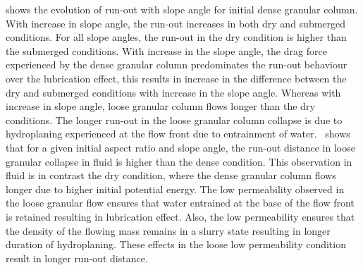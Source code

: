  shows the evolution of run-out with slope angle 
for initial dense granular column. With increase in slope angle, the run-out 
increases in both dry and submerged conditions. For all slope angles, the 
run-out in the dry condition is higher than the submerged conditions. With 
increase in the slope angle, the drag force experienced by the dense granular 
column predominates the run-out behaviour over the lubrication effect, this 
results in increase in the difference between the dry and submerged conditions 
with increase in the slope angle. Whereas with increase in slope angle, loose 
granular column flows longer than the dry conditions. The longer run-out in the 
loose granular column collapse is due to hydroplaning experienced at the flow 
front due to entrainment of water.~ shows that for a 
given initial aspect ratio and slope angle, the run-out distance in loose 
granular collapse in fluid is higher than the dense condition. This observation 
in fluid is in contrast the dry condition, where the dense granular column 
flows longer due to higher initial potential energy. The low permeability 
observed in the loose granular flow ensures that water entrained at the base of 
the flow front is retained resulting in lubrication effect. Also, the low 
permeability ensures that the density of the flowing mass remains in a slurry 
state resulting in longer duration of hydroplaning. These effects in the loose 
low permeability condition result in longer run-out distance. 

